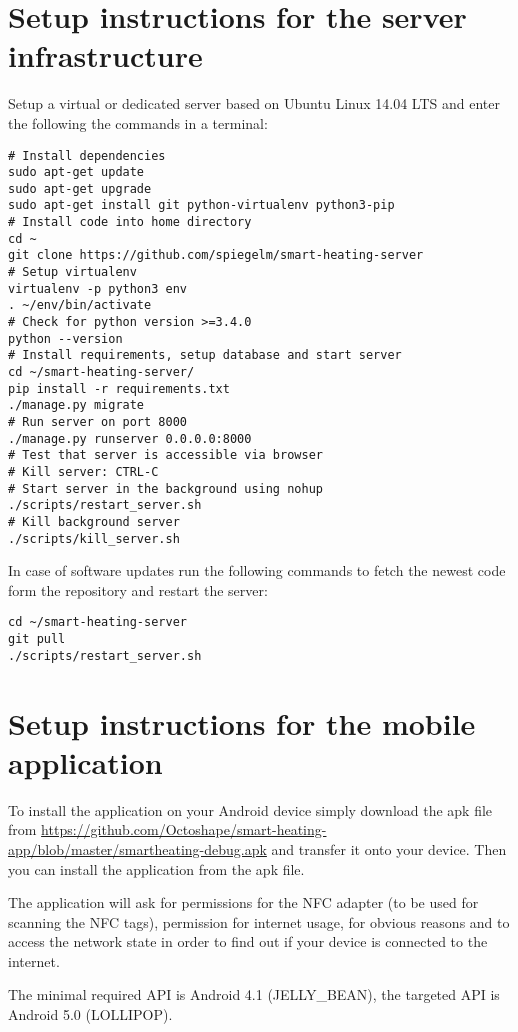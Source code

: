 \section{Setup instructions for the server infrastructure}

Setup a virtual or dedicated server based on Ubuntu Linux 14.04 LTS and enter the following the commands in a terminal:

\noindent
\begin{minipage}{\linewidth}
	\begin{lstlisting}
# Install dependencies
sudo apt-get update
sudo apt-get upgrade
sudo apt-get install git python-virtualenv python3-pip
# Install code into home directory
cd ~
git clone https://github.com/spiegelm/smart-heating-server
# Setup virtualenv
virtualenv -p python3 env
. ~/env/bin/activate
# Check for python version >=3.4.0
python --version
# Install requirements, setup database and start server
cd ~/smart-heating-server/
pip install -r requirements.txt
./manage.py migrate
# Run server on port 8000
./manage.py runserver 0.0.0.0:8000
# Test that server is accessible via browser
# Kill server: CTRL-C
# Start server in the background using nohup
./scripts/restart_server.sh
# Kill background server
./scripts/kill_server.sh
	\end{lstlisting}
\end{minipage}

In case of software updates run the following commands to fetch the newest code form the repository and restart the server:

\noindent
\begin{minipage}{\linewidth}
	\begin{lstlisting}
cd ~/smart-heating-server
git pull
./scripts/restart_server.sh
	\end{lstlisting}
\end{minipage}



\section{Setup instructions for the mobile application}

To install the application on your Android device simply download the apk file from \url{https://github.com/Octoshape/smart-heating-app/blob/master/smartheating-debug.apk} and transfer it onto your device. Then you can install the application from the apk file.

The application will ask for permissions for the NFC adapter (to be used for scanning the NFC tags), permission for internet usage, for obvious reasons and to access the network state in order to find out if your device is connected to the internet.

The minimal required API is Android 4.1 (JELLY\_BEAN), the targeted API is Android 5.0 (LOLLIPOP).








